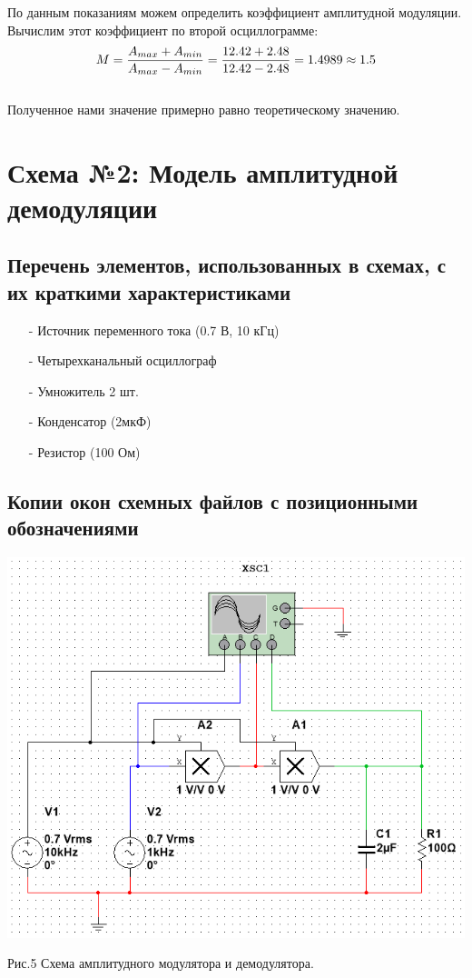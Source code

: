 \documentclass[11pt]{article}
\begin{document}
По данным показаниям можем определить коэффициент амплитудной модуляции. Вычислим этот коэффициент по второй осциллограмме:
\\
$$
M = \frac{{A_{max}+A_{min}}}{A_{max}-A_{min}} = \frac{{12.42+2.48}}{12.42-2.48}=1.4989\approx 1.5\\
$$
\\
Полученное нами значение примерно равно теоретическому значению.


\newpage
\section{Схема №2: Модель амплитудной демодуляции}
\subsection{Перечень элементов, использованных в схемах, с
их краткими характеристиками}
\begin{itemize}
    \item[-] Источник переменного тока (0.7 В, 10 кГц)
    \item[-] Четырехканальный осциллограф
    \item[-] Умножитель 2 шт.
    \item[-] Конденсатор (2мкФ)
    \item[-] Резистор (100 Ом)
\end{itemize}


\subsection{Копии окон схемных файлов с позиционными обозначениями}
\includegraphics[width=1\linewidth]{img/second.png}
\begin{center}
    Рис.5 Схема амплитудного модулятора и демодулятора.
\end{center}
\end{document}
